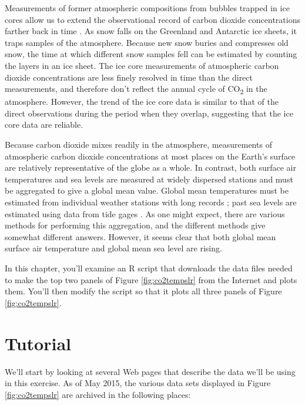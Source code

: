 \documentclass[
  11pt,
]{book}
\begin{document}
Measurements of former atmospheric compositions from bubbles trapped in ice cores allow us to extend the observational record of carbon dioxide concentrations farther back in time \citep[black curve in Fig. \ref{fig:co2tempslr}, top panel]{MacFarling_Meure2006-wa}. As snow falls on the Greenland and Antarctic ice sheets, it traps samples of the atmosphere. Because new snow buries and compresses old snow, the time at which different snow samples fell can be estimated by counting the layers in an ice sheet. The ice core measurements of atmospheric carbon dioxide concentrations are less finely resolved in time than the direct measurements, and therefore don't reflect the annual cycle of CO\textsubscript{2} in the atmosphere. However, the trend of the ice core data is similar to that of the direct observations during the period when they overlap, suggesting that the ice core data are reliable.

Because carbon dioxide mixes readily in the atmosphere, measurements of atmospheric carbon dioxide concentrations at most places on the Earth's surface are relatively representative of the globe as a whole. In contrast, both surface air temperatures and sea levels are measured at widely dispersed stations and must be aggregated to give a global mean value. Global mean temperatures must be estimated from individual weather stations with long records \citep{Hansen2010-wg}; past sea levels are estimated using data from tide gages \citep{Jevrejeva2014-my}. As one might expect, there are various methods for performing this aggregation, and the different methods give somewhat different answers. However, it seems clear that both global mean surface air temperature and global mean sea level are rising.

In this chapter, you'll examine an R script that downloads the data files needed to make the top two panels of Figure \ref{fig:co2tempslr} from the Internet and plots them. You'll then modify the script so that it plots all three panels of Figure \ref{fig:co2tempslr}.

\hypertarget{tutorial}{%
\section{Tutorial}\label{tutorial}}

We'll start by looking at several Web pages that describe the data we'll be using in this exercise. As of May 2015, the various data sets displayed in Figure \ref{fig:co2tempslr} are archived in the following places:
\end{document}
